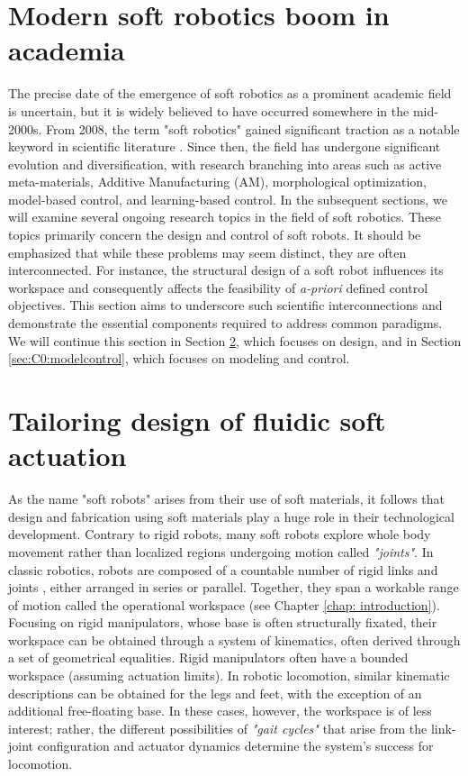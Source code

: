 \vspace{-3mm}
\section{Modern soft robotics boom in academia}
The precise date of the emergence of soft robotics as a prominent academic field is uncertain, but it is widely believed to have occurred somewhere in the mid-2000s. From 2008, the term "soft robotics" gained significant traction as a notable keyword in scientific literature \cite{Bao2018Jun}. Since then, the field has undergone significant evolution and diversification, with research branching into areas such as active meta-materials, Additive Manufacturing (AM), morphological optimization, model-based control, and learning-based control. In the subsequent sections, we will examine several ongoing research topics in the field of soft robotics. These topics primarily concern the design and control of soft robots. It should be emphasized that while these problems may seem distinct, they are often interconnected. For instance, the structural design of a soft robot influences its workspace and consequently affects the feasibility of \textit{a-priori} defined control objectives. This section aims to underscore such scientific interconnections and demonstrate the essential components required to address common paradigms. We will continue this section in Section \ref{sec:C2:conventional_actuation}, which focuses on design, and in Section \ref{sec:C0:modelcontrol}, which focuses on modeling and control. \vspace{-2mm}
%
\section{Tailoring design of fluidic soft actuation}
\label{sec:C2:conventional_actuation}
As the name "soft robots" arises from their use of soft materials, it follows that design and fabrication using soft materials play a huge role in their technological development. Contrary to rigid robots, many soft robots explore whole body movement rather than localized regions undergoing motion called \textit{"joints"}. In classic robotics, robots are composed of a countable number of rigid links and joints \cite{Spong2006, Murray1994, Corke2011}, either arranged in series or parallel. Together, they span a workable range of motion called the operational workspace \cite{Spong2006} (see Chapter \ref{chap: introduction}). Focusing on rigid manipulators, whose base is often structurally fixated, their workspace can be obtained through a system of kinematics, often derived through a set of geometrical equalities. Rigid manipulators often have a bounded workspace (assuming actuation limits). In robotic locomotion, similar kinematic descriptions can be obtained for the legs and feet, with the exception of an additional free-floating base. In these cases, however, the workspace is of less interest; rather, the different possibilities of \textit{"gait cycles"} that arise from the link-joint configuration and actuator dynamics determine the system's success for locomotion.


